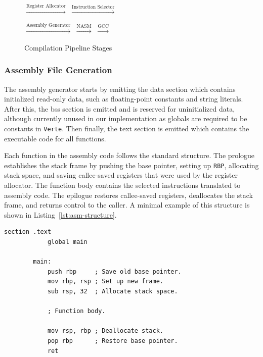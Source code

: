 \documentclass[11pt]{article}
\newcommand{\code}[1]{\texttt{#1}}
\newcommand{\verte}{\texttt{Verte}}
\newcommand{\lstref}[1]{Listing~\ref{#1}}
\begin{document}
\begin{figure}[h]
	\centering
	\small
	\setlength{\fboxsep}{6pt}
	\setlength{\fboxrule}{0.5pt}

	$\xrightarrow{\text{Register Allocator}}$
	$\xrightarrow{\text{Instruction Selector}}$

	\vspace{0.5em}

	$\xrightarrow{\text{Assembly Generator}}$
	$\xrightarrow{\text{NASM}}$
	$\xrightarrow{\text{GCC}}$

	\caption{Compilation Pipeline Stages}
	\label{fig:pipeline}
\end{figure}

\subsubsection{Assembly File Generation}

The assembly generator starts by emitting the data section which contains initialized read-only data, such as floating-point constants and string literals. After this, the bss section is emitted and is reserved for uninitialized data, although currently unused in our implementation as globals are required to be constants in \verte. Then finally, the text section is emitted which contains the executable code for all functions.

Each function in the assembly code follows the standard structure. The prologue establishes the stack frame by pushing the base pointer, setting up \code{RBP}, allocating stack space, and saving callee-saved registers that were used by the register allocator. The function body contains the selected instructions translated to assembly code. The epilogue restores callee-saved registers, deallocates the stack frame, and returns control to the caller. A minimal example of this structure is shown in \lstref{lst:asm-structure}.

\begin{lstlisting}[language={[x86masm]Assembler}, caption={Assembly Function Structure}, label={lst:asm-structure}]
        section .text
            global main
        
        main:
            push rbp     ; Save old base pointer.
            mov rbp, rsp ; Set up new frame.
            sub rsp, 32  ; Allocate stack space.
        
            ; Function body.
        
            mov rsp, rbp ; Deallocate stack.
            pop rbp      ; Restore base pointer.
            ret
    \end{lstlisting}
\end{document}
